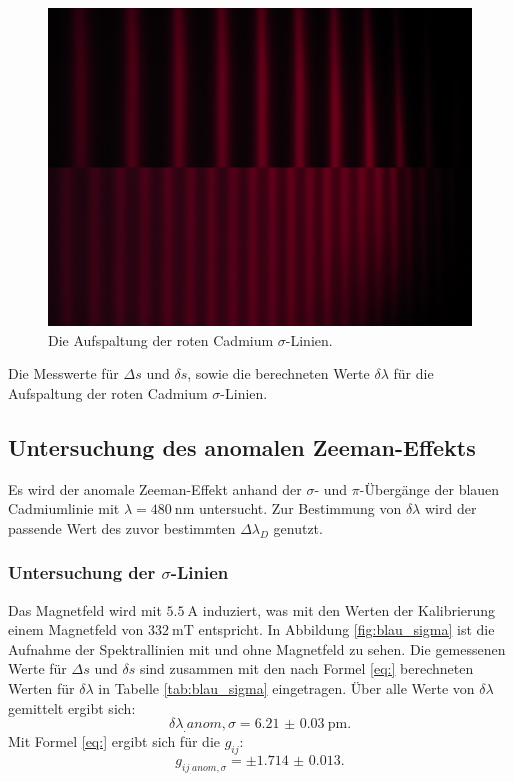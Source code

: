 \begin{figure}
	\centering
	\includegraphics[width=\linewidth-130pt,height=\textheight-130pt,keepaspectratio]{content/images/rot_sigma.jpg}
	\caption{Die Aufspaltung der roten Cadmium $\sigma$-Linien.}
	\label{fig:rot_sigma}
\end{figure}

\begin{table}
	\centering
	\caption{Die Messwerte für $\Delta s$ und $\delta s$, sowie die berechneten Werte $\delta\lambda$ für die Aufspaltung der roten Cadmium $\sigma$-Linien.}
	
	\label{tab:rot_sigma}
\end{table}

\subsection{Untersuchung des anomalen Zeeman-Effekts}

Es wird der anomale Zeeman-Effekt anhand der $\sigma$- und $\pi$-Übergänge der blauen Cadmiumlinie mit $\lambda=\SI{480}{\nano\metre}$ untersucht. Zur Bestimmung von $\delta\lambda$ wird der passende Wert des zuvor bestimmten $\Delta\lambda_D$ genutzt. 

\subsubsection{Untersuchung der $\sigma$-Linien}

Das Magnetfeld wird mit $\SI{5.5}{\ampere}$ induziert, was mit den Werten der Kalibrierung einem Magnetfeld von $\SI{332}{\milli\tesla}$ entspricht. In Abbildung \ref{fig:blau_sigma} ist die Aufnahme der Spektrallinien mit und ohne Magnetfeld zu sehen. Die gemessenen Werte für $\Delta s$ und $\delta s$ sind zusammen mit den nach Formel \eqref{eq:} berechneten Werten für $\delta\lambda$ in Tabelle \ref{tab:blau_sigma} eingetragen.
Über alle Werte von $\delta\lambda$ gemittelt ergibt sich:
\[
\delta\lambda_.{anom,\sigma} = \SI{6.21(3)}{\pico\metre}\text{.}
\]
Mit Formel \eqref{eq:} ergibt sich für die $g_{ij}$:
\[
g_{ij_.{anom,\sigma}} = \pm\num{1.714(13)}\text{.}
\]

